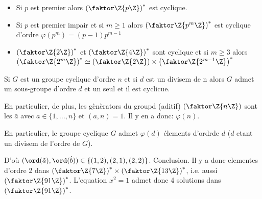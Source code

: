 \begin{rappel}
	\begin{itemize}
		\item Si $p$ est premier alors $\left(\faktor\Z{p\Z}\right)^\ast$ est cyclique.
		\item Si $p$ est  premier impair et si $m\geq 1$ alors $\left(\faktor\Z{p^m\Z}\right)^\ast$ est cyclique d'ordre $\varphi (p^m)=(p-1)p^{m-1}$
		\item $\left(\faktor\Z{2\Z}\right)^\ast$ et $\left(\faktor\Z{4\Z}\right)^\ast$ sont cyclique et si $m\geq 3$ alors $\left(\faktor\Z{2^m\Z}\right)^\ast\simeq\left(\faktor\Z{2\Z}\right)\times \left(\faktor\Z{2^{m-1}\Z}\right)^\ast$
	\end{itemize}
	Si $G$ est un groupe cyclique d'ordre $n$ et si $d$ est un divisem de n alors $G$ admet un sous-groupe d'ordre $d$ et un seul et il est cyclicue.
	
	En particulier, de plus, les gènèrators du groupd (aditif) $\left(\faktor\Z{n\Z}\right)$ sont les $\bar a$ avec $a\in\{1,...,n\}$ et $(a,n)=1$. Il y en a donc: $\varphi (n)$.
	
	En particulier, le groupe cyclique $G$ admet $\varphi (d)$ élements d'ordrde $d$ ($d$ etant un divisem de l'ordre de $G$).
\end{rappel}

D'où $(\ord(\tilde a),\ord(\dot b))\in \{(1,2),(2,1),(2,2)\}$. Conclusion. Il y a donc  elementes d'ordre 2 dans $\left( \faktor\Z{7\Z} \right)^\ast \times \left( \faktor\Z{13\Z} \right)^\ast$, i.e. aussi $\left(\faktor\Z{91\Z}\right)^\ast$. L'equation $x^2=1$ admet donc 4 solutions dans $\left(\faktor\Z{91\Z}\right)^\ast$.

